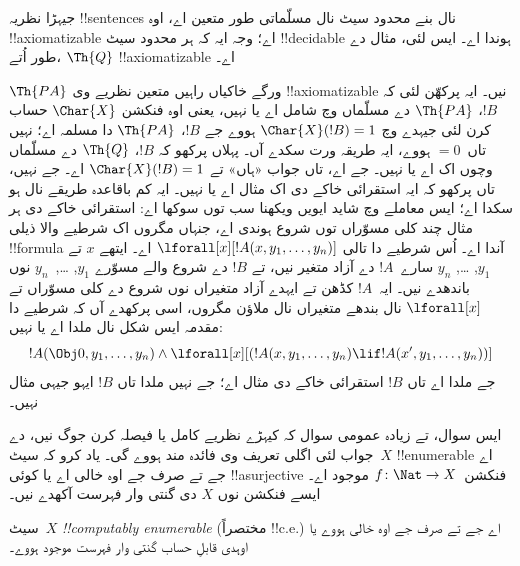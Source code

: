 \documentclass[../../../include/open-logic-section]{subfiles}
\begin{document}
\begin{ex}
جیہڑا نظریہ
!!{sentence}s نال بنے
محدود سیٹ
نال مسلّماتی
طور متعین اے،
اوہ
!!{axiomatizable}
اے؛ وجہ ایہ
کہ ہر محدود
سیٹ
!!{decidable}
ہوندا اے۔
ایس لئی، مثال
دے طور اُتے،
$\Th{Q}$
!!{axiomatizable}
اے۔

$\Th{PA}$
ورگے خاکیاں
راہیں متعین
نظریے وی
!!{axiomatizable}
نیں۔ ایہ
پرکھّن لئی
کہ $!B$،
$\Th{PA}$
دے مسلّماں
وچ شامل اے
یا نہیں، یعنی
اوہ فنکشن
$\Char{X}$
حساب کرن لئی
جیہدے وچ
$\Char{X}(!B) = 1$
ہووے جے
$!B$،
$\Th{PA}$
دا مسلمہ
اے؛ نہیں
تاں~$= 0$
ہووے،
ایہ طریقہ
ورت سکدے آں۔
پہلاں پرکھو
کہ $!B$،
$\Th{Q}$
دے مسلّماں
وچوں اک اے
یا نہیں۔
جے اے،
تاں جواب
«ہاں» تے
$\Char{X}(!B) = 1$
اے۔ جے
نہیں، تاں
پرکھو کہ
ایہ استقرائی
خاکے دی
اک مثال
اے یا نہیں۔
ایہ کم
باقاعدہ طریقے
نال ہو
سکدا اے؛
ایس معاملے
وچ شاید
ایویں ویکھنا
سب توں سوکھا
اے: استقرائی
خاکے دی
ہر مثال
چند کلی
مسوّراں توں
شروع ہوندی
اے، جنہاں
مگروں اک
شرطیے والا
ذیلی
!!{formula}
آندا اے۔
اُس شرطیے
دا تالی
$\lforall[x][!A(x, y_1, \dots, y_n)]$
اے۔ ایتھے
$x$ تے
$y_1$, \dots, $y_n$
سارے~$!A$
دے آزاد
متغیر نیں،
تے $!B$
دے شروع والے
مسوّرے
$y_1$, \dots,~$y_n$
نوں باندھدے
نیں۔ ایہ~$!A$
کڈھن تے ایہدے
آزاد متغیراں
نوں شروع دے کلی
مسوّراں تے
$\lforall[x]$
نال بندھے
متغیراں
نال ملاؤن
مگروں، اسی
پرکھدے آں
کہ شرطیے
دا مقدمہ
ایس شکل
نال ملدا
اے یا نہیں:
\[
!A(\Obj 0, y_1, \dots, y_n) \land \lforall[x][(!A(x, y_1, \dots, y_n)
\lif !A(x', y_1, \dots, y_n))]
\]
جے ملدا اے
تاں $!B$
استقرائی
خاکے دی
مثال اے؛
جے نہیں ملدا
تاں $!B$
ایہو جیہی مثال
نہیں۔
\end{ex}

ایس سوال،
تے زیادہ
عمومی سوال
کہ کیہڑے
نظریے
کامل یا
فیصلہ کرن
جوگ نیں،
دے جواب
لئی اگلی
تعریف وی
فائدہ مند
ہووے گی۔
یاد کرو
کہ سیٹ~$X$
!!{enumerable}
اے جے تے
صرف جے اوہ
خالی اے
یا کوئی
!!a{surjective}
فنکشن~$f \colon \Nat
\to X$ موجود
اے۔ ایسے
فنکشن نوں
$X$ دی
گنتی وار
فہرست آکھدے
نیں۔

\begin{defn}
سیٹ~$X$
\emph{!!{computably enumerable}}
(مختصراً
!!{c.e.}) اے
جے تے
صرف جے اوہ
خالی ہووے
یا اوہدی
قابلِ حساب
گنتی وار
فہرست
موجود ہووے۔
\end{defn}
\end{document}
